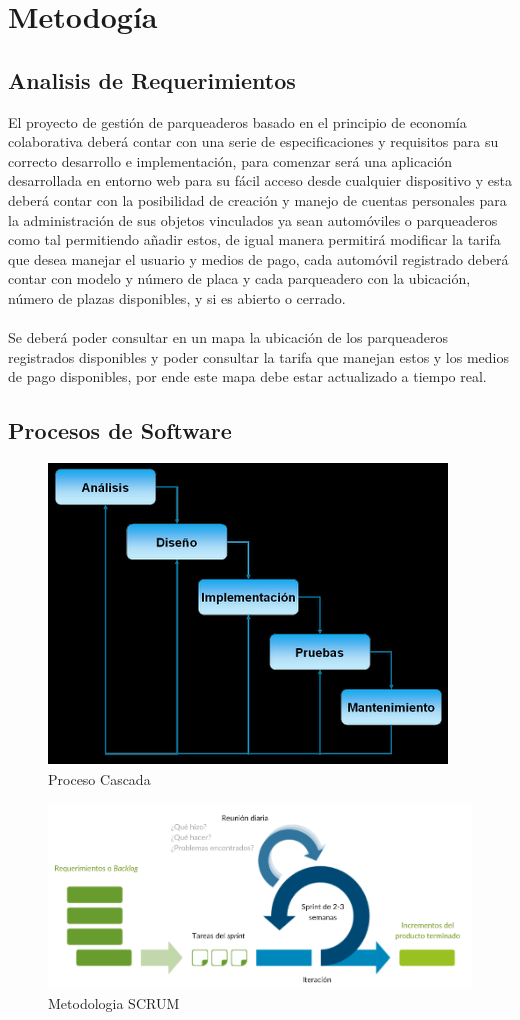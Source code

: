 \chapter{Metodogía}
\section{Analisis de Requerimientos}
El proyecto de gestión de parqueaderos basado en el principio de economía colaborativa deberá contar con una serie de especificaciones y requisitos para su correcto desarrollo e implementación, para comenzar será una aplicación desarrollada en entorno web para su fácil acceso desde cualquier dispositivo y esta deberá contar con la posibilidad de creación y manejo de cuentas personales para la administración de sus objetos vinculados ya sean automóviles o parqueaderos como tal permitiendo añadir estos, de igual manera permitirá modificar la tarifa que desea manejar el usuario y medios de pago, cada automóvil registrado deberá contar con modelo y número de placa y cada parqueadero con la ubicación, número de plazas disponibles, y si es abierto o cerrado.
\\
\\
Se deberá poder consultar en un mapa la ubicación de los parqueaderos registrados disponibles y poder consultar la tarifa que manejan estos  y los medios de pago disponibles, por ende este mapa debe estar actualizado a tiempo real.

\newpage

\section{Procesos de Software}

\begin{figure}[h!]
	\centering
	\includegraphics[width=0.8\linewidth]{imgs/Cascada}
	\caption[Cascada]{Proceso Cascada}
\end{figure}
\begin{figure}[h!]
	\centering
	\includegraphics[width=0.9\linewidth]{imgs/Scrum}
	\caption[SCRUM]{Metodologia SCRUM}
\end{figure}